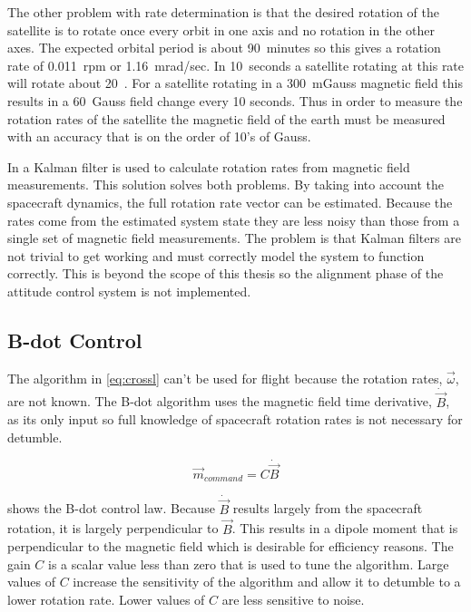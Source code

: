 The other problem with rate determination is that the desired rotation of the satellite is to rotate once every orbit in one axis and no rotation in the other axes. The expected orbital period is about 90~minutes so this gives a rotation rate of 0.011~rpm or 1.16~mrad/sec. In 10~seconds a satellite rotating at this rate will rotate about 20~\textmu\textdegree. For a satellite rotating in a 300~mGauss magnetic field this results in a 60~\textmu Gauss field change every 10 seconds. Thus in order to measure the rotation rates of the satellite the magnetic field of the earth must be measured with an accuracy that is on the order of 10's of \textmu Gauss. 

In \cite{Sturm05} a Kalman filter is used to calculate rotation rates from magnetic field measurements. This solution solves both problems. By taking into account the spacecraft dynamics, the full rotation rate vector can be estimated. Because the rates come from the estimated system state they are less noisy than those from a single set of magnetic field measurements. The problem is that Kalman filters are not trivial to get working and must correctly model the system to function correctly. This is beyond the scope of this thesis so the alignment phase of the attitude control system is not implemented.

\subsection{B-dot Control}

The algorithm in \cref{eq:crossl} can't be used for flight because the rotation rates, $\vec{\omega}$, are not known. The B-dot algorithm uses the magnetic field time derivative, $\dot{\vec{B}}$, as its only input so full knowledge of spacecraft rotation rates is not necessary for detumble.

\begin{equation}
    \vec{m}_{command}= C \dot{\vec{B}}
    \label{eq:bg-bdot}
\end{equation}

 shows the B-dot control law. Because $\dot{\vec{B}}$ results largely from the spacecraft rotation, it is largely perpendicular to $\vec{B}$. This results in a dipole moment that is perpendicular to the magnetic field which is desirable for efficiency reasons. The gain $C$ is a scalar value less than zero that is used to tune the algorithm. Large values of $C$ increase the sensitivity of the algorithm and allow it to detumble to a lower rotation rate. Lower values of $C$ are less sensitive to noise. \cite{Vej10}
